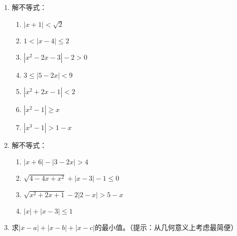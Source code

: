 \begin{enumerate}
    \item 解不等式：
\begin{multicols}{2}
\begin{enumerate}[(1)]
    \item $|x+1|<\sqrt{2}$
    \item $1<|x-4|\leqslant2$
    \item $| x^{2}-2x-3|-2>0$
    \item $3\leqslant|5-2x|<9$
    \item $|x^{2}+2x-1|<2$
    \item $|x^{2}-1|\geqslant x$
    \item $|x^{3}-1|>1-x$
\end{enumerate}
\end{multicols}

\item 解不等式：
\begin{multicols}{2}
\begin{enumerate}[(1)]
    \item $|x+6|-|3-2x|>4$
    \item $\sqrt{4-4x+x^{2}}+|x-3|-1\leq0$
    \item $\sqrt{x^{2}+2x+1}-2|2-x|>5-x$
    \item $|x|+|x-3|\leqslant1$
\end{enumerate}
\end{multicols}

\item 求$|x-a|+|x-b|+|x-c|$的最小值。（提示：从几何意义上考虑最简便）
\end{enumerate}










































